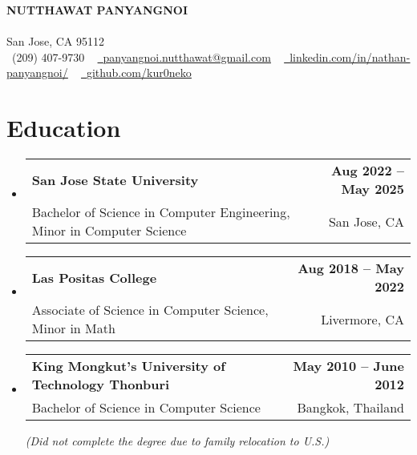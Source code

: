 \documentclass[letterpaper,11pt]{article}
\makeatletter
\newcommand{\resumeSubheading}[4]{
  \vspace{-2pt}\item
    \begin{tabular*}{1.0\textwidth}[t]{l@{\extracolsep{\fill}}r}
      \textbf{#1} & \textbf{\small #2} \\
      {\small#3} & {\small #4} \\
    \end{tabular*}\vspace{-7pt}
}
\newcommand{\resumeSubHeadingListStart}{\begin{itemize}[leftmargin=0.0in, label={}]}
\newcommand{\resumeSubHeadingListEnd}{\end{itemize}}
\makeatother
\begin{document}
\vspace{-10pt}
\begin{center}
    {\Huge \scshape\textbf {NUTTHAWAT PANYANGNOI}}\\ 
    \vspace{1pt}{https://kur0neko.com}\\ \vspace{1pt} 
    \vspace{0.5pt} San Jose, CA 95112 \\ \vspace{0.5pt}
    \small \raisebox{-0.1\height}\faPhone\ (209) 407-9730 ~ \href{mailto:panyangnoi.nutthawat@gmail.com}{\raisebox{-0.2\height}\faEnvelope\  \underline{panyangnoi.nutthawat@gmail.com}} ~ 
    \href{https://www.linkedin.com/in/nathan-panyangnoi/}{\raisebox{-0.2\height}\faLinkedin\ \underline{linkedin.com/in/nathan-panyangnoi/}}  ~
    \href{https://github.com/kur0neko}{\raisebox{-0.2\height}\faGithub\ \underline{github.com/kur0neko}}
    \vspace{-8pt}
\end{center}


\section{Education}
  \resumeSubHeadingListStart
    \resumeSubheading
      {San Jose State University}{Aug 2022 -- May 2025}
      {Bachelor of Science in Computer Engineering, Minor in Computer Science}{San Jose, CA}
      \resumeSubheading
      {Las Positas College}{Aug 2018 -- May 2022}
      {Associate of Science in Computer Science, Minor in Math}{Livermore, CA}
      \resumeSubheading
      {King Mongkut’s University of Technology Thonburi}{May 2010 -- June 2012}
      {Bachelor of Science in Computer Science} {Bangkok, Thailand}
      \newline
      \textit{(Did not complete the degree due to family relocation to U.S.) }
  \resumeSubHeadingListEnd
\end{document}
